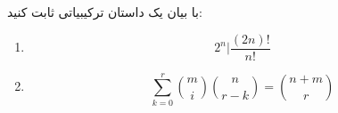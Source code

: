 \EXERCISE
با بیان یک داستان ترکیبیاتی ثابت کنید:
\begin{enumerate}
\item
$$2^n | \frac{(2n)!}{n!}$$
\item
$$\sum_{k=0}^{r} \binom{m}{i} \binom{n}{r-k} = \binom{n+m}{r}$$
\end{enumerate}